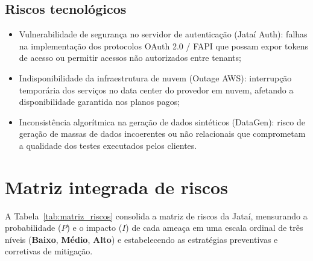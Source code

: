 \documentclass[
  12pt,
  openright,
  oneside,
  a4paper,
  brazilian
]{abntex2}
\begin{document}
\subsection{Riscos tecnológicos}
\label{subsec:riscos_tecnologicos}
\begin{itemize}
    \item{Vulnerabilidade de segurança no servidor de autenticação (Jataí Auth):} falhas na implementação dos protocolos OAuth 2.0 / FAPI que possam expor tokens de acesso ou permitir acessos não autorizados entre tenants;
    \item{Indisponibilidade da infraestrutura de nuvem (Outage AWS):} interrupção temporária dos serviços no data center do provedor em nuvem, afetando a disponibilidade garantida nos planos pagos;
    \item{Inconsistência algorítmica na geração de dados sintéticos (DataGen):} risco de geração de massas de dados incoerentes ou não relacionais que comprometam a qualidade dos testes executados pelos clientes.
\end{itemize}

\section{Matriz integrada de riscos}
\label{sec:matriz_riscos}

A Tabela~\ref{tab:matriz_riscos} consolida a matriz de riscos da Jataí, mensurando a probabilidade ($P$) e o impacto ($I$) de cada ameaça em uma escala ordinal de três níveis (\textbf{Baixo}, \textbf{Médio}, \textbf{Alto}) e estabelecendo as estratégias preventivas e corretivas de mitigação.
\end{document}

